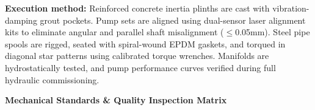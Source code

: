 \noindent
\begin{minipage}[t]{0.185\textwidth}\end{minipage}\hfill
\begin{minipage}[t]{0.185\textwidth}\end{minipage}\hfill
\begin{minipage}[t]{0.185\textwidth}\end{minipage}\hfill
\begin{minipage}[t]{0.185\textwidth}\end{minipage}\hfill
\begin{minipage}[t]{0.185\textwidth}\end{minipage}

\vspace{0.20cm}

\noindent
\begin{tcolorbox}[enhanced, colback=mhoffwhite, colframe=mhlightgray, boxrule=0.7pt, arc=4pt, left=9pt, right=9pt, top=7pt, bottom=7pt, borderline west={3pt}{0pt}{mhgold}, drop shadow=black!4]
    {\fontsize{8.1pt}{11.0pt}\selectfont\color{mhtext}
    \textbf{Execution method:} Reinforced concrete inertia plinths are cast with vibration-damping grout pockets. Pump sets are aligned using dual-sensor laser alignment kits to eliminate angular and parallel shaft misalignment ($\le$0.05mm). Steel pipe spools are rigged, seated with spiral-wound EPDM gaskets, and torqued in diagonal star patterns using calibrated torque wrenches. Manifolds are hydrostatically tested, and pump performance curves verified during full hydraulic commissioning.
    }
\end{tcolorbox}

\vfill

\noindent
{\large\bfseries\color{mhnavy} Mechanical Standards \& Quality Inspection Matrix}
\vspace{0.10cm}

